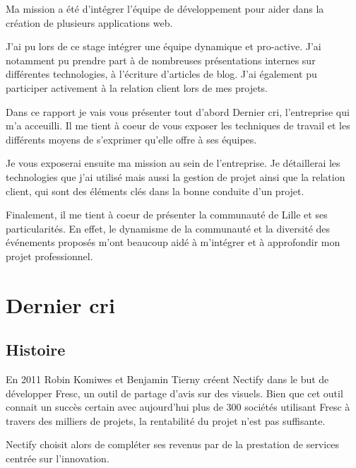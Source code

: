 \bigskip

Ma mission a été d'intégrer l'équipe de développement pour aider dans la
création de plusieurs applications web.

\bigskip

J'ai pu lors de ce stage intégrer une équipe dynamique et pro-active.
J'ai notamment pu prendre part à de nombreuses présentations internes
sur différentes technologies, à l'écriture d'articles de blog. J'ai
également pu participer activement à la relation client lors de mes
projets.

\bigskip

Dans ce rapport je vais vous présenter tout d'abord Dernier cri,
l'entreprise qui m'a acceuilli. Il me tient à coeur de vous exposer les
techniques de travail et les différents moyens de s'exprimer qu'elle
offre à ses équipes.

\bigskip

Je vous exposerai ensuite ma mission au sein de l'entreprise. Je
détaillerai les technologies que j'ai utilisé mais aussi la gestion de
projet ainsi que la relation client, qui sont des éléments clés dans la
bonne conduite d'un projet.

\bigskip

Finalement, il me tient à coeur de présenter la communauté de Lille et
ses particularités. En effet, le dynamisme de la communauté et la
diversité des événements proposés m'ont beaucoup aidé à m'intégrer et à
approfondir mon projet professionnel.

\newpage

\section{Dernier cri}\label{dernier-cri}

\bigskip

\subsection{Histoire}\label{histoire}

\bigskip

En 2011 Robin Komiwes et Benjamin Tierny créent Nectify dans le but de
développer Fresc, un outil de partage d'avis sur des visuels. Bien que
cet outil connait un succès certain avec aujourd'hui plus de 300
sociétés utilisant Fresc à travers des milliers de projets, la
rentabilité du projet n'est pas suffisante.

\bigskip

Nectify choisit alors de compléter ses revenus par de la prestation de
services centrée sur l'innovation.

